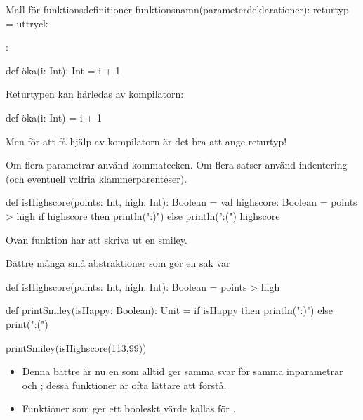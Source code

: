 \begin{Slide}{Mall för funktionsdefinitioner}
 funktionsnamn(parameterdeklarationer): returtyp = uttryck

\pause\vspace{0.3em}\SlideFontSmall
{}:

\begin{Code}[basicstyle=\ttfamily\fontsize{9}{11}\selectfont]
def öka(i: Int): Int = i + 1
\end{Code}
\pause Returtypen kan härledas av kompilatorn:
\begin{Code}[basicstyle=\ttfamily\fontsize{9}{11}\selectfont]
def öka(i: Int) = i + 1
\end{Code}
Men för att få hjälp av kompilatorn är det bra att ange returtyp!

\pause 

Om flera parametrar använd kommatecken. Om flera satser använd indentering (och eventuell valfria klammerparenteser).
\begin{Code}[basicstyle=\ttfamily\fontsize{8}{10}\selectfont]
def isHighscore(points: Int, high: Int): Boolean = {
  val highscore: Boolean = points > high
  if highscore then println(":)") else println(":(")
  highscore
}
\end{Code}
\pause Ovan funktion har  att skriva ut en smiley.
\end{Slide}

\begin{Slide}{Bättre många små abstraktioner som gör en sak var}

\begin{Code}[basicstyle=\ttfamily\fontsize{8}{11}\selectfont]
def isHighscore(points: Int, high: Int): Boolean = points > high

def printSmiley(isHappy: Boolean): Unit =
  if isHappy then println(":)") else print(":(")
\end{Code}

\pause\vspace{1em}
\begin{REPLnonum}
  printSmiley(isHighscore(113,99))
\end{REPLnonum}

\pause
\begin{itemize}
  \item Denna bättre  är nu en  som alltid ger samma svar för samma inparametrar och ; dessa funktioner är ofta lättare att förstå.
  \item Funktioner som ger ett booleskt värde kallas för .
\end{itemize}

\end{Slide}



